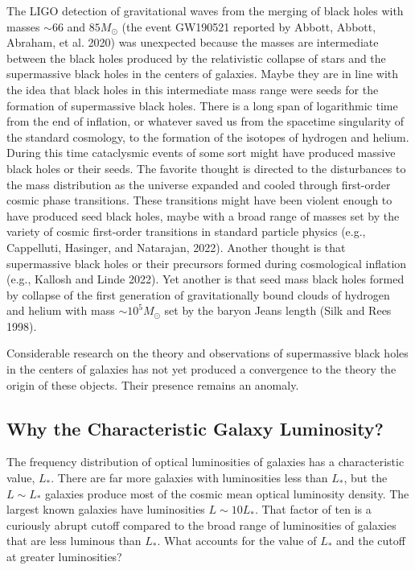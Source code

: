 \documentclass[fleqn,12pt]{article}
\begin{document}
The LIGO detection of gravitational waves from the merging of black holes with masses $\sim 66$ and $85 M_\odot$ (the event GW190521 reported by Abbott, Abbott, Abraham, et al. 2020) was unexpected because the masses are intermediate between the black holes produced by the relativistic collapse of stars and the supermassive black holes in the centers of galaxies. Maybe they are in line with the idea that black holes in this intermediate mass range were seeds for the formation of supermassive black holes. There is a long span of logarithmic time from the end of inflation, or whatever saved us from the spacetime  singularity of the standard cosmology, to the formation of the isotopes of hydrogen and helium. During this time cataclysmic events of some sort might have produced massive black holes or their seeds.  The favorite thought is directed to the disturbances to the mass distribution as the universe expanded and cooled through first-order cosmic phase transitions. These transitions might have been violent enough to have produced seed black holes, maybe with a broad range of masses set by the variety of cosmic first-order transitions in standard particle physics (e.g., Cappelluti, Hasinger, and Natarajan, 2022). Another thought is that supermassive black holes or their precursors  formed during cosmological inflation (e.g., Kallosh and Linde 2022). Yet another is that seed mass black holes formed by collapse of the first generation of gravitationally bound clouds of hydrogen and helium with mass $\sim 10^5M_\odot$ set by the baryon Jeans length (Silk and Rees 1998). 

Considerable research on the theory and observations of supermassive black holes in the centers of galaxies has not yet produced a convergence to the theory the origin of these objects. Their presence remains an anomaly.

\subsection{Why the Characteristic Galaxy Luminosity?}\label{sec:Lstar}

The frequency distribution of optical luminosities of galaxies has a characteristic value, $L_\ast$. There are far more galaxies with luminosities less than $L_\ast$, but the $L\sim L_\ast$ galaxies produce most of the cosmic mean optical luminosity density. The largest known galaxies have luminosities $L\sim 10 L_\ast$. That factor of ten is a curiously abrupt cutoff compared to the broad range of luminosities of galaxies that are less luminous than $L_\ast$. What accounts for the value of $L_\ast$ and the cutoff at greater luminosities?
\end{document}
